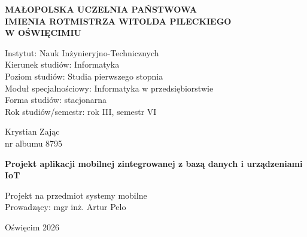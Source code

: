 \thispagestyle{empty}

\begin{center}
    \vspace*{-1cm} %
    
    {\Large\textbf{\selectfont
        MAŁOPOLSKA UCZELNIA PAŃSTWOWA \\
        IMIENIA ROTMISTRZA WITOLDA PILECKIEGO \\
        W OŚWIĘCIMIU} \\[2.5em]} %
        \vspace{0.5cm}
            \begin{flushleft}
                {\normalsize
                \hspace*{3cm} Instytut: Nauk Inżynieryjno-Technicznych \\[1em]
                \hspace*{3cm} Kierunek studiów: Informatyka \\[1em]
                \hspace*{3cm} Poziom studiów: Studia pierwszego stopnia \\[1em]
                \hspace*{3cm} Moduł specjalnościowy: Informatyka w przedsiębiorstwie \\[1em]
                \hspace*{3cm} Forma studiów: stacjonarna \\[1em]
                \hspace*{3cm} Rok studiów/semestr: rok III, semestr VI}
            \end{flushleft}
        
        \vspace{1cm}
    
    {\normalsize
    Krystian Zając \\[1em]
    nr albumu 8795}
    
    \vspace{1cm}
    
    {\Large\textbf{\selectfont
    Projekt aplikacji mobilnej zintegrowanej z bazą danych i urządzeniami IoT}}
    
    \vspace{3cm}
    
    \begin{center}
    {\normalsize
    \hspace*{9cm}Projekt na przedmiot systemy mobilne \\[0.5em]
    \hspace*{9.9cm}Prowadzący: mgr inż. Artur Pelo \\[0.5em]}
    \end{center}
    
    \vfill
    \vspace{3cm}
   
    {\normalsize
    Oświęcim 2026}
    
\end{center}

\newpage